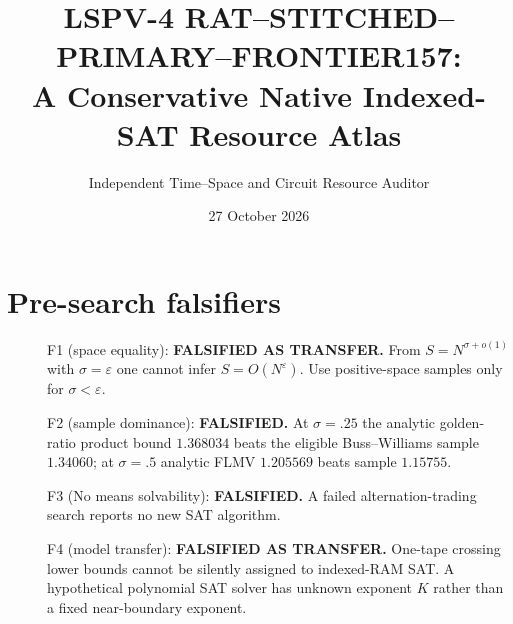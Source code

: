\documentclass[11pt]{article}
\title{LSPV-4 RAT--STITCHED--PRIMARY--FRONTIER157:\\A Conservative Native Indexed-SAT Resource Atlas}
\author{Independent Time--Space and Circuit Resource Auditor}
\date{27 October 2026}
\begin{document}
\maketitle
\begin{center}\end{center}
\section{Pre-search falsifiers}
\begin{description}
\item[] F1 (space equality): \textbf{FALSIFIED AS TRANSFER.}
From $S=N^{\sigma+o(1)}$ with $\sigma=\varepsilon$ one
cannot infer $S=O(N^\varepsilon)$. Use positive-space samples
only for $\sigma<\varepsilon$.
\item[] F2 (sample dominance): \textbf{FALSIFIED.}
At $\sigma=.25$ the analytic golden-ratio product bound
$1.368034$ beats the eligible Buss--Williams sample $1.34060$;
at $\sigma=.5$ analytic FLMV $1.205569$ beats sample $1.15755$.
\item[] F3 (No means solvability): \textbf{FALSIFIED.}
A failed alternation-trading search reports no new SAT algorithm.
\item[] F4 (model transfer): \textbf{FALSIFIED AS TRANSFER.}
One-tape crossing lower bounds cannot be silently assigned to
indexed-RAM SAT. A hypothetical polynomial SAT solver has
unknown exponent $K$ rather than a fixed near-boundary exponent.
\end{description}
\end{document}

